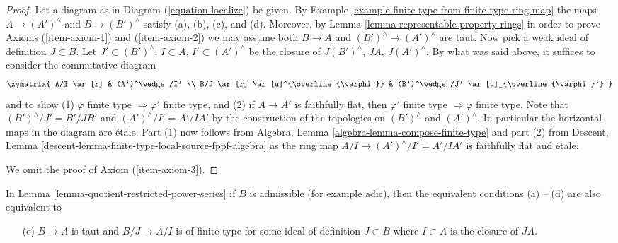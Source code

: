 \begin{proof}
\medskip\noindent
Let a diagram as in Diagram (\ref{equation-localize})
be given. By Example \ref{example-finite-type-from-finite-type-ring-map}
the maps $A \to (A')^\wedge$ and $B \to (B')^\wedge$
satisfy (a), (b), (c), and (d). Moreover, by
Lemma \ref{lemma-representable-property-rings}
in order to prove Axioms (\ref{item-axiom-1}) and (\ref{item-axiom-2})
we may assume both $B \to A$ and $(B')^\wedge \to (A')^\wedge$
are taut. Now pick a weak ideal of definition $J \subset B$. Let
$J' \subset (B')^\wedge$, $I \subset A$, $I' \subset (A')^\wedge$
be the closure of $J(B')^\wedge$, $JA$, $J(A')^\wedge$.
By what was said above, it suffices to consider the commutative
diagram
$$
\xymatrix{
A/I \ar[r] & (A')^\wedge/I' \\
B/J \ar[r] \ar[u]^{\overline{\varphi}} &
(B')^\wedge/J' \ar[u]_{\overline{\varphi}'}
}
$$
and to show (1) $\overline{\varphi}$ finite type
$\Rightarrow \overline{\varphi}'$
finite type, and (2) if $A \to A'$ is faithfully flat, then
$\overline{\varphi}'$ finite type $\Rightarrow \overline{\varphi}$
finite type. Note that $(B')^\wedge/J' = B'/JB'$ and
$(A')^\wedge/I' = A'/IA'$ by the construction of the topologies on
$(B')^\wedge$ and $(A')^\wedge$. In particular the horizontal
maps in the diagram are \'etale. Part (1) now follows from
Algebra, Lemma \ref{algebra-lemma-compose-finite-type}
and part (2) from
Descent, Lemma \ref{descent-lemma-finite-type-local-source-fppf-algebra}
as the ring map $A/I \to (A')^\wedge/I' = A'/IA'$ is faithfully flat
and \'etale.

\medskip\noindent
We omit the proof of Axiom (\ref{item-axiom-3}).
\end{proof}

\begin{lemma}
\label{lemma-quotient-restricted-power-series-admissible}
In Lemma \ref{lemma-quotient-restricted-power-series}
if $B$ is admissible (for example adic), then the equivalent conditions
(a) -- (d) are also equivalent to
\begin{enumerate}
\item[(e)] $B \to A$ is taut and $B/J \to A/I$ is of finite type for
some ideal of definition $J \subset B$ where $I \subset A$ is
the closure of $JA$.
\end{enumerate}
\end{lemma}

